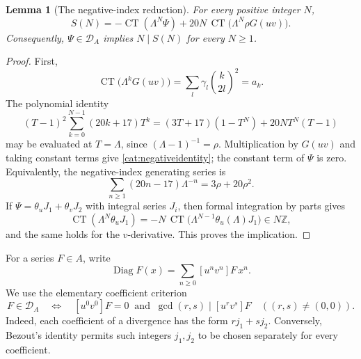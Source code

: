 \documentclass[11pt,a4paper]{article}
\newtheorem{lemma}[theorem]{Lemma}
\theoremstyle{remark}\newtheorem{remark}[theorem]{Remark}
\newcommand{\Z}{\mathbb Z}
\newcommand{\CT}{\operatorname{CT}}
\begin{document}
\begin{lemma}[The negative-index reduction]\label{cat:negative}
For every positive integer \(N\),
\begin{equation}\label{cat:negativeidentity}
 S(N)=-\CT(\Lambda^N\Psi)
       +20N\,\CT\bigl(\Lambda^N\rho G(uv)\bigr).
\end{equation}
Consequently, \(\Psi\in\mathcal D_A\) implies \(N\mid S(N)\) for every
\(N\ge1\).
\end{lemma}
\begin{proof}
First,
\[
 \CT\bigl(\Lambda^kG(uv)\bigr)
 =\sum_l\gamma_l\binom{k}{2l}^{\!2}=a_k.
\]
The polynomial identity
\[
 (T-1)^2\sum_{k=0}^{N-1}(20k+17)T^k
 =(3T+17)(1-T^N)+20NT^N(T-1)
\]
may be evaluated at \(T=\Lambda\), since \((\Lambda-1)^{-1}=\rho\).
Multiplication by \(G(uv)\) and taking constant terms give
\eqref{cat:negativeidentity}; the constant term of \(\Psi\) is zero.
Equivalently, the negative-index generating series is
\[
 \sum_{n\ge1}(20n-17)\Lambda^{-n}=3\rho+20\rho^2.
\]
If \(\Psi=\theta_uJ_1+\theta_vJ_2\) with integral series \(J_i\), then
formal integration by parts gives
\[
 \CT(\Lambda^N\theta_uJ_1)
 =-N\,\CT\bigl(\Lambda^{N-1}\theta_u(\Lambda)J_1\bigr)\in N\Z,
\]
and the same holds for the \(v\)-derivative. This proves the implication.
\end{proof}

For a series \(F\in A\), write
\[
 \operatorname{Diag}F(x)=\sum_{n\ge0}[u^nv^n]F\,x^n.
\]
We use the elementary coefficient criterion
\begin{equation}\label{cat:bezout}
 F\in\mathcal D_A
 \quad\Longleftrightarrow\quad
 [u^0v^0]F=0\ \text{ and }\
 \gcd(r,s)\mid[u^rv^s]F\quad((r,s)\ne(0,0)).
\end{equation}
Indeed, each coefficient of a divergence has the form \(rj_1+sj_2\).
Conversely, Bezout's identity permits such integers \(j_1,j_2\) to be
chosen separately for every coefficient.
\end{document}
